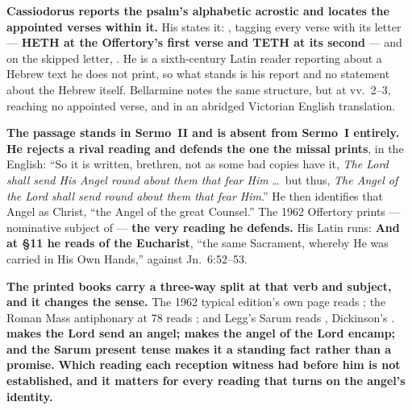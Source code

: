 \textbf{Cassiodorus reports the psalm's alphabetic acrostic and locates the
appointed verses within it.} His 
states it: , tagging every verse with its letter ---
\textbf{HETH at the Offertory's first verse and TETH at its second} --- and on
the skipped letter, . He is a sixth-century Latin reader
reporting about a Hebrew text he does not print, so
what stands is his report and no statement about the Hebrew itself. Bellarmine
notes the same structure, but at vv.~2--3, reaching
no appointed verse, and in an abridged Victorian English translation.

\begin{witnessnote}
\textbf{The passage stands in Sermo~II and is absent from Sermo~I entirely.}
\textbf{He rejects a rival reading and defends the one the
missal prints}, in the  English: ``So it is
written, brethren, not as some bad copies have it,
\emph{The Lord shall send His Angel round about them that fear Him} \dots\ but
thus, \emph{The Angel of the Lord shall send round about them that fear Him}.''
He then identifies that Angel as Christ, ``the Angel of the great Counsel.'' The
1962 Offertory prints  --- 
nominative subject of  --- \textbf{the very reading he defends.}
His Latin runs:  \textbf{And at §11 he reads
 of the Eucharist}, ``the same Sacrament, whereby He
was carried in His Own Hands,'' against Jn.\ 6:52--53.
\end{witnessnote}

\textbf{The printed books carry a three-way split at that verb and subject, and
it changes the sense.} The 1962 typical edition's own page
reads ; the Roman Mass
antiphonary at  78 reads ; and Legg's Sarum reads , Dickinson's
. \textbf{ makes
the Lord send an angel;  makes the angel of the
Lord encamp; and the Sarum present tense makes it a standing fact rather than a
promise.} \textbf{Which reading each reception witness had before him is not
established, and it matters for every reading that turns on the angel's
identity.}

